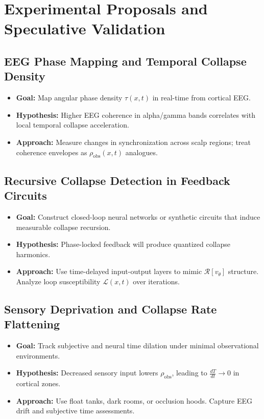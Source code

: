 
\chapter{Experimental Proposals and Speculative Validation}

\section{EEG Phase Mapping and Temporal Collapse Density}

\begin{itemize}
  \item \textbf{Goal:} Map angular phase density $\tau(x,t)$ in real-time from cortical EEG.
  \item \textbf{Hypothesis:} Higher EEG coherence in alpha/gamma bands correlates with local temporal collapse acceleration.
  \item \textbf{Approach:} Measure changes in synchronization across scalp regions; treat coherence envelopes as $\rho_{\text{obs}}(x,t)$ analogues.
\end{itemize}

\section{Recursive Collapse Detection in Feedback Circuits}

\begin{itemize}
  \item \textbf{Goal:} Construct closed-loop neural networks or synthetic circuits that induce measurable collapse recursion.
  \item \textbf{Hypothesis:} Phase-locked feedback will produce quantized collapse harmonics.
  \item \textbf{Approach:} Use time-delayed input-output layers to mimic $\mathcal{R}[v_\theta]$ structure. Analyze loop susceptibility $\mathcal{L}(x,t)$ over iterations.
\end{itemize}

\section{Sensory Deprivation and Collapse Rate Flattening}

\begin{itemize}
  \item \textbf{Goal:} Track subjective and neural time dilation under minimal observational environments.
  \item \textbf{Hypothesis:} Decreased sensory input lowers $\rho_{\text{obs}}$, leading to $\frac{dT}{dt} \rightarrow 0$ in cortical zones.
  \item \textbf{Approach:} Use float tanks, dark rooms, or occlusion hoods. Capture EEG drift and subjective time assessments.
\end{itemize}

